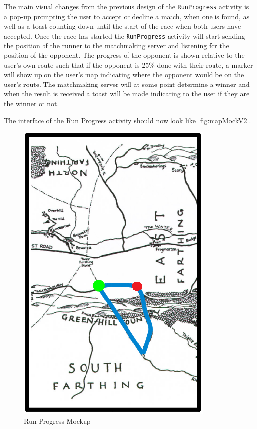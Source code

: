 The main visual changes from the previous design of the \texttt{RunProgress} activity is a pop-up prompting the user to accept or decline a match, when one is found, as well as a toast counting down until the start of the race when both users have accepted. Once the race has started the \texttt{RunProgress} activity will start sending the position of the runner to the matchmaking server and listening for the position of the opponent. The progress of the opponent is shown relative to the user's own route such that if the opponent is 25\% done with their route, a marker will show up on the user's map indicating where the opponent would be on the user's route. The matchmaking server will at some point determine a winner and when the result is received a toast will be made indicating to the user if they are the winner or not.

The interface of the Run Progress activity should now look like \autoref{fig:mapMockV2}.

\begin{figure}[!ht]
	\begin{center}
		\includegraphics[scale=0.4]{img/mapMockV2.png}
		\caption{Run Progress Mockup}
		\label{fig:mapMockV2}
	\end{center}
\end{figure}

